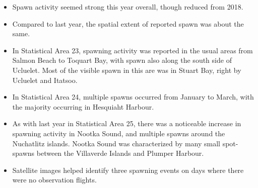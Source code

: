 \begin{itemize}
\item Spawn activity seemed strong this year overall, though reduced from 2018.
\item Compared to last year, the spatial extent of reported spawn was about the same.
\item In Statistical Area 23, spawning activity was reported in the usual areas from Salmon Beach to Toquart Bay, with spawn also along the south side of Ucluelet.
Most of the visible spawn in this are was in Stuart Bay, right by Ucluelet and Itatsoo.
\item In Statistical Area 24, multiple spawns occurred from January to March, with the majority occurring in Hesquiaht Harbour.
\item As with last year in Statistical Area 25, there was a noticeable increase in spawning activity in Nootka Sound, and multiple spawns around the Nuchatlitz islands.
Nootka Sound was characterized by many small spot-spawns between the Villaverde Islands and Plumper Harbour.
\item Satellite images helped identify three spawning events on days where there were no observation flights.
\end{itemize}